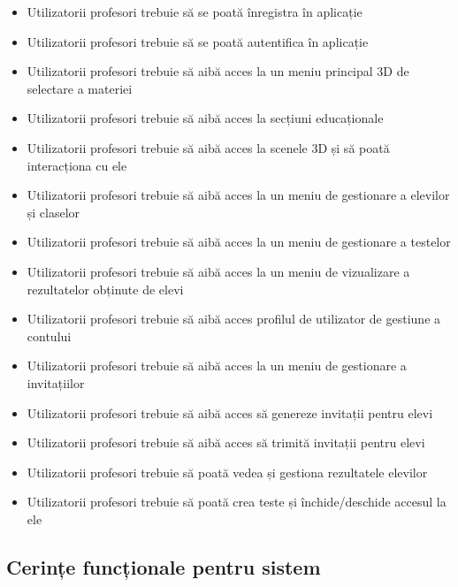 \begin{itemize}
    \item Utilizatorii profesori trebuie să se poată înregistra în aplicație
    \item Utilizatorii profesori trebuie să se poată autentifica în aplicație
    \item Utilizatorii profesori trebuie să aibă acces la un meniu principal 3D de selectare a materiei
    \item Utilizatorii profesori trebuie să aibă acces la secțiuni educaționale
    \item Utilizatorii profesori trebuie să aibă acces la scenele 3D și să poată interacționa cu ele
    \item Utilizatorii profesori trebuie să aibă acces la un meniu de gestionare a elevilor și claselor
    \item Utilizatorii profesori trebuie să aibă acces la un meniu de gestionare a testelor
    \item Utilizatorii profesori trebuie să aibă acces la un meniu de vizualizare a rezultatelor obținute de elevi
    \item Utilizatorii profesori trebuie să aibă acces profilul de utilizator de gestiune a contului
    \item Utilizatorii profesori trebuie să aibă acces la un meniu de gestionare a invitațiilor
    \item Utilizatorii profesori trebuie să aibă acces să genereze invitații pentru elevi
    \item Utilizatorii profesori trebuie să aibă acces să trimită invitații pentru elevi
    \item Utilizatorii profesori trebuie să poată vedea și gestiona rezultatele elevilor
    \item Utilizatorii profesori trebuie să poată crea teste și închide/deschide accesul la ele
\end{itemize}

\subsection{Cerințe funcționale pentru sistem}
\label{sub-sec:proj-requirements-system}

